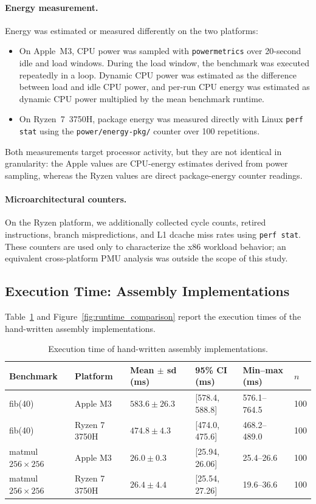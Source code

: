 \documentclass{tcsa}
\begin{document}
\paragraph{Energy measurement.}
Energy was estimated or measured differently on the two platforms:
\begin{itemize}
  \item On Apple~M3, CPU power was sampled with \texttt{powermetrics}
        over 20-second idle and load windows. During the load window,
        the benchmark was executed repeatedly in a loop. Dynamic CPU
        power was estimated as the difference between load and idle CPU
        power, and per-run CPU energy was estimated as dynamic CPU power
        multiplied by the mean benchmark runtime.
  \item On Ryzen~7~3750H, package energy was measured directly with
        Linux \texttt{perf stat} using the
        \texttt{power/energy-pkg/} counter over 100 repetitions.
\end{itemize}

Both measurements target processor activity, but they are not identical
in granularity: the Apple values are CPU-energy estimates derived from
power sampling, whereas the Ryzen values are direct package-energy
counter readings.

\paragraph{Microarchitectural counters.}
On the Ryzen platform, we additionally collected cycle counts,
retired instructions, branch mispredictions, and L1 dcache miss
rates using \texttt{perf stat}. These counters are used only to
characterize the x86 workload behavior; an equivalent cross-platform
PMU analysis was outside the scope of this study.

\subsection{Execution Time: Assembly Implementations}
\label{sec:time_results}

Table~\ref{tab:asm_time} and Figure~\ref{fig:runtime_comparison}
report the execution times of the hand-written assembly
implementations.

\begin{table}[!ht]
\centering
\small
\caption{Execution time of hand-written assembly implementations.}
\label{tab:asm_time}
\begin{tabularx}{\textwidth}{llXXXX}
\toprule
Benchmark & Platform & Mean $\pm$ sd (ms) & 95\% CI (ms) & Min--max (ms) & $n$ \\
\midrule
fib(40) & Apple M3 & $583.6 \pm 26.3$ & [578.4, 588.8] & 576.1--764.5 & 100 \\
fib(40) & Ryzen 7 3750H & $474.8 \pm 4.3$ & [474.0, 475.6] & 468.2--489.0 & 100 \\
matmul $256\times256$ & Apple M3 & $26.0 \pm 0.3$ & [25.94, 26.06] & 25.4--26.6 & 100 \\
matmul $256\times256$ & Ryzen 7 3750H & $26.4 \pm 4.4$ & [25.54, 27.26] & 19.6--36.6 & 100 \\
\bottomrule
\end{tabularx}
\end{table}
\end{document}
